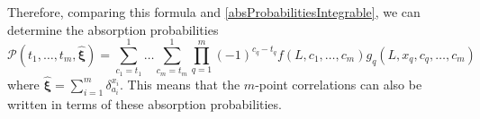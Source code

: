 \documentclass[10pt]{article}
\numberwithin{equation}{section}
\numberwithin{equation}{subsection}
\begin{document}
Therefore, comparing this formula and \eqref{absProbabilitiesIntegrable}, we can determine the absorption probabilities 
\begin{equation}
	\mathcal{P}(t_{1},\ldots,t_{m},\hat{\bm{\xi}})=\sum_{c_{1}=t_{1}}^{1}\ldots\sum_{c_{m}=t_{m}}^{1}\prod_{q=1}^{m}(-1)^{c_{q}-t_{q}}f(L,c_{1},\ldots,c_{m})g_{q}(L,x_{q},c_{q},\ldots,c_{m})
\end{equation}
where $\hat{\bm{\xi}}=\sum_{i=1}^{m}\delta_{a_{i}}^{x_{i}}$. 
This means that the $m$-point correlations can also be written in terms of these absorption probabilities. 
\end{document}

